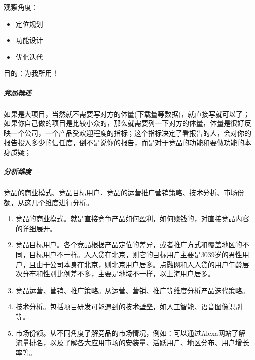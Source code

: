 \documentclass[letterpaper,10pt,english]{sphinxmanual}
\begin{document}
观察角度：
\begin{itemize}
\item {} 
定位规划

\item {} 
功能设计

\item {} 
优化迭代

\end{itemize}

目的：为我所用！


\subparagraph{竞品概述}
\label{\detokenize{chapter_knowledge/goods_analysis:id17}}
如果是大项目，当然就不需要写对方的体量(下载量等数据)，就直接写就可以了；如果你自己做的项目是比较小众的，那么就需要列一下对方的体量，体量是很好反映一个公司，一个产品受欢迎程度的指标；这个指标决定了看报告的人，会对你的报告投入多少的信任度，倒不是说你的报告，而是对于竞品的功能和要做功能的本身质疑；%
\begin{footnote}[529]\sphinxAtStartFootnote
{}
%
\end{footnote}


\subparagraph{分析维度}
\label{\detokenize{chapter_knowledge/goods_analysis:id18}}
竞品的商业模式、竞品目标用户、竞品的运营推广营销策略、技术分析、市场份额，从这几个维度进行分析。%
\begin{footnote}[530]\sphinxAtStartFootnote
{}
%
\end{footnote}
\begin{enumerate}
%
\item {} 
竞品的商业模式。就是直接竞争产品如何盈利，如何赚钱的，对直接竞品内容的详细展开。

\item {} 
竞品目标用户。各个竞品根据产品定位的差异，或者推广方式和覆盖地区的不同，目标用户不一样。人人贷在北京，则它的目标用户主要是30\sphinxhyphen{}39岁的男性用户，且由于公司本身在北京，则北京用户居多。点融网和人人贷的用户年龄层次分布和性别比例差不多，主要是地域不一样，以上海用户居多。

\item {} 
竞品运营、营销、推广策略。从运营、营销、推广等维度分析产品迭代策略。

\item {} 
技术分析。包括项目研发可能遇到的技术壁垒，如人工智能、语音图像识别等。

\item {} 
市场份额。从不同角度了解竞品的市场情况，例如：可以通过Alexa网站了解流量排名，以及了解各大应用市场的安装量、活跃用户、地区分布、用户增长率等。

\end{enumerate}
\end{document}
